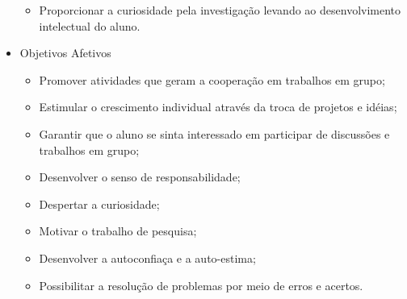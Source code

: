 \begin{itemize}
\begin{itemize}
\item Proporcionar a curiosidade pela investigação levando ao desenvolvimento intelectual do aluno.
\end{itemize}
\item Objetivos Afetivos
\begin{itemize}
\item Promover atividades que geram a cooperação em trabalhos em grupo;
\item Estimular o crescimento individual através da troca de projetos e idéias;
\item Garantir que o aluno se sinta interessado em participar de discussões e trabalhos em grupo;
\item Desenvolver o senso de responsabilidade;
\item Despertar a curiosidade;
\item Motivar o trabalho de pesquisa;
\item Desenvolver a autoconfiaça e a auto-estima;
\item Possibilitar a resolução de problemas por meio de erros e acertos.
\end{itemize}
\end{itemize}


